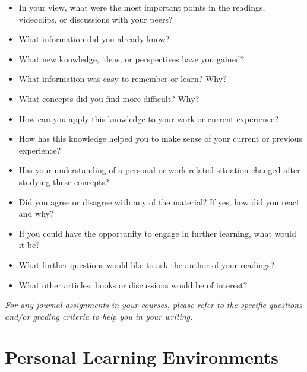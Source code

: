 \documentclass[
]{book}
\providecommand{\tightlist}{%
  \setlength{\itemsep}{0pt}\setlength{\parskip}{0pt}}
\theoremstyle{definition}
\theoremstyle{definition}
\theoremstyle{definition}
\theoremstyle{definition}
\theoremstyle{remark}
\begin{document}
\begin{reflect}
\begin{itemize}
\tightlist
\item
  In your view, what were the most important points in the readings, videoclips, or discussions with your peers?\\
\item
  What information did you already know?\\
\item
  What new knowledge, ideas, or perspectives have you gained?\\
\item
  What information was easy to remember or learn? Why?\\
\item
  What concepts did you find more difficult? Why?\\
\item
  How can you apply this knowledge to your work or current experience?\\
\item
  How has this knowledge helped you to make sense of your current or previous experience?\\
\item
  Has your understanding of a personal or work-related situation changed after studying these concepts?\\
\item
  Did you agree or disagree with any of the material? If yes, how did you react and why?\\
\item
  If you could have the opportunity to engage in further learning, what would it be?\\
\item
  What further questions would like to ask the author of your readings?\\
\item
  What other articles, books or discussions would be of interest?
\end{itemize}

\emph{For any journal assignments in your courses, please refer to the specific questions and/or grading
criteria to help you in your writing.}
\end{reflect}

\hypertarget{personal-learning-environments}{%
\section{Personal Learning Environments}\label{personal-learning-environments}}
\end{document}
